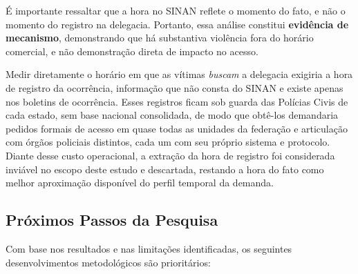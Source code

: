 \documentclass[twocolumn, 10pt]{article}
\begin{document}
É importante ressaltar que a hora no SINAN reflete o momento do fato, e não
o momento do registro na delegacia. Portanto, essa análise constitui
\textbf{evidência de mecanismo}, demonstrando que há substantiva violência
fora do horário comercial, e não demonstração direta de impacto no acesso.

Medir diretamente o horário em que as vítimas \textit{buscam} a delegacia
exigiria a hora de registro da ocorrência, informação que não consta do SINAN
e existe apenas nos boletins de ocorrência. Esses registros ficam sob guarda
das Polícias Civis de cada estado, sem base nacional consolidada, de modo que
obtê-los demandaria pedidos formais de acesso em quase todas as unidades da
federação e articulação com órgãos policiais distintos, cada um com seu próprio
sistema e protocolo. Diante desse custo operacional, a extração da hora de
registro foi considerada inviável no escopo deste estudo e descartada,
restando a hora do fato como melhor aproximação disponível do perfil temporal
da demanda.

\subsection{Próximos Passos da Pesquisa}

Com base nos resultados e nas limitações identificadas, os seguintes
desenvolvimentos metodológicos são prioritários:
\end{document}
